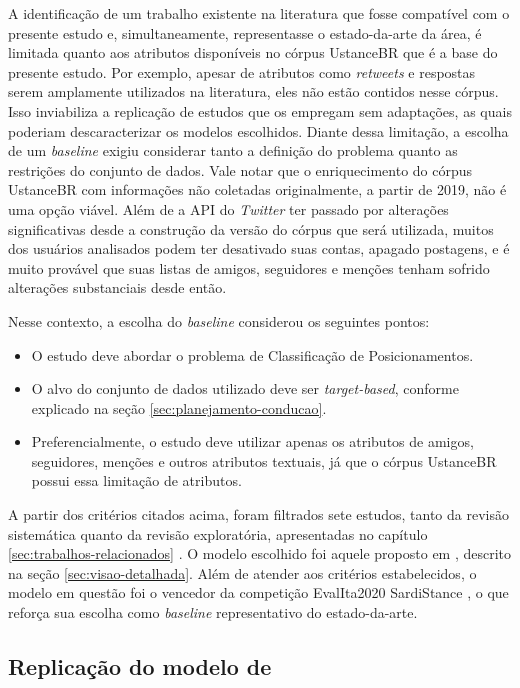 \documentclass[
	12pt, oneside, a4paper, english, brazil
]{abntex2ppgsi}
\begin{document}
A identificação de um trabalho existente na literatura que fosse compatível com o presente estudo e, simultaneamente, representasse o estado-da-arte da área, é limitada quanto aos atributos disponíveis no córpus UstanceBR que é a base do presente estudo. Por exemplo, apesar de atributos como {\em retweets} e respostas serem amplamente utilizados na literatura, eles não estão contidos nesse córpus. Isso inviabiliza a replicação de estudos que os empregam sem adaptações, as quais poderiam descaracterizar os modelos escolhidos. Diante dessa limitação, a escolha de um {\em baseline} exigiu considerar tanto a definição do problema quanto as restrições do conjunto de dados. Vale notar que o enriquecimento do córpus UstanceBR com informações não coletadas originalmente, a partir de 2019, não é uma opção viável. Além de a API do {\em Twitter} ter passado por alterações significativas desde a construção da versão do córpus que será utilizada, muitos dos usuários analisados podem ter desativado suas contas, apagado postagens, e é muito provável que suas listas de amigos, seguidores e menções tenham sofrido alterações substanciais desde então.

Nesse contexto, a escolha do {\em baseline} considerou os seguintes pontos:
\begin{itemize}
  \item O estudo deve abordar o problema de Classificação de Posicionamentos.
  \item O alvo do conjunto de dados utilizado deve ser {\em target-based}, conforme explicado na seção \ref{sec:planejamento-conducao}.
  \item Preferencialmente, o estudo deve utilizar apenas os atributos de amigos, seguidores, menções e outros atributos textuais, já que o córpus UstanceBR possui essa limitação de atributos.
\end{itemize}

A partir dos critérios citados acima, foram filtrados sete estudos, tanto da revisão sistemática quanto da revisão exploratória, apresentadas no capítulo \ref{sec:trabalhos-relacionados} . O modelo escolhido foi aquele proposto em , descrito na seção \ref{sec:visao-detalhada}. Além de atender aos critérios estabelecidos, o modelo em questão foi o vencedor da competição EvalIta2020 SardiStance \cite{cignarella2020}, o que reforça sua escolha como {\em baseline} representativo do estado-da-arte.

\subsection{Replicação do modelo de }
\label{sec:classificacao}
\end{document}
